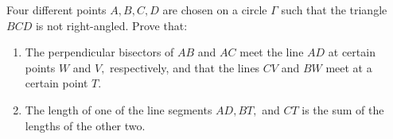 Four different points $ A,B,C,D$ are chosen on a circle $ \Gamma$ such that the triangle $ BCD$ is not right-angled. Prove that:

\begin{enumerate}[label = (\alph*)]
	\item The perpendicular bisectors of $ AB$ and $ AC$ meet the line $ AD$ at certain points $ W$ and $ V,$ respectively, and that the lines $ CV$ and $ BW$ meet at a certain point $ T.$
	\item The length of one of the line segments $ AD, BT,$ and $ CT$ is the sum of the lengths of the other two.
\end{enumerate}
